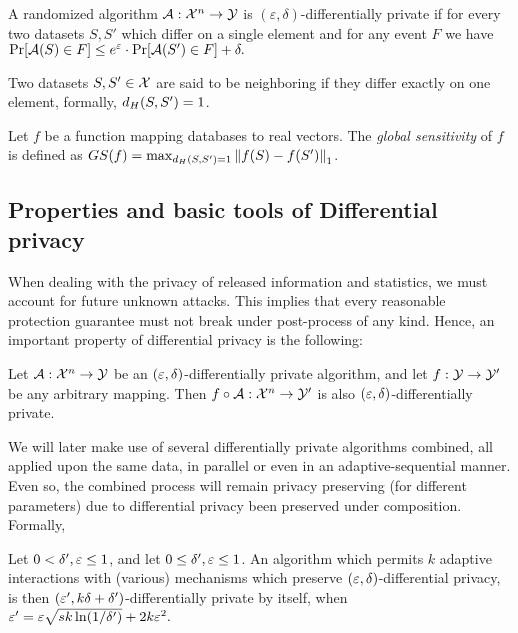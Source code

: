 \documentclass[12pt,a4paper,oneside,onecolumn]{book}
\begin{document}
\begin{definition}
  A randomized algorithm $\mathcal{A}:\mathcal{X}^n\to \mathcal{Y}$
  is $(\varepsilon,\delta)$-differentially private
  if for every two datasets $S,S'$ which differ on a single element and for any event $F$ we have 
  $\Pr[\mathcal{A}(S)\in F]\leq e^{\varepsilon}\cdot \Pr[\mathcal{A}(S')\in F]+\delta.$
\end{definition}

Two datasets $S, S'\in\mathcal{X}$ are said to be neighboring if they differ exactly on one element,
formally,
$d_H(S,S') = 1$.

\begin{definition}
Let $f$ be a function mapping databases to real vectors. 
The {\em global sensitivity} of $f$ is defined as 
$GS(f) = \max_{d_H(S,S')=1}\left\Vert f(S)-f(S') \right\Vert_1$.
\end{definition}

\subsection{Properties and basic tools of Differential privacy}

When dealing with the privacy of released information and statistics, we must account for future unknown attacks.
This implies that every reasonable protection guarantee must not break under post-process of any kind. 
Hence, an important property of differential privacy is the following:
\begin{theorem}
Let $\mathcal{A}:\mathcal{X}^n\to\mathcal{Y}$ be an $(\varepsilon, \delta)$-differentially private algorithm, and let $f:\mathcal{Y}\to\mathcal{Y}'$ be any arbitrary mapping. Then $f\circ\mathcal{A}:\mathcal{X}^n\to\mathcal{Y}'$ is also $(\varepsilon, \delta)$-differentially private.
\end{theorem}

We will later make use of several differentially private algorithms combined, all applied upon the same data, in parallel or even in an adaptive-sequential manner.
Even so, the combined process will remain privacy preserving (for different parameters) due to differential privacy been preserved under composition. Formally,
\begin{theorem}
Let $0<\delta', \varepsilon\leq1$,
and let $0\leq\delta', \varepsilon\leq1$.
An algorithm which permits $k$ adaptive interactions with (various) mechanisms which preserve $(\varepsilon, \delta)$-differential privacy, 
is then 
$(\varepsilon', k\delta+\delta')$-differentially private by itself, 
when
$\varepsilon' = 
\varepsilon\sqrt{sk\ln(1/\delta')} + 2k\varepsilon^2.
$
\end{theorem}
\end{document}
